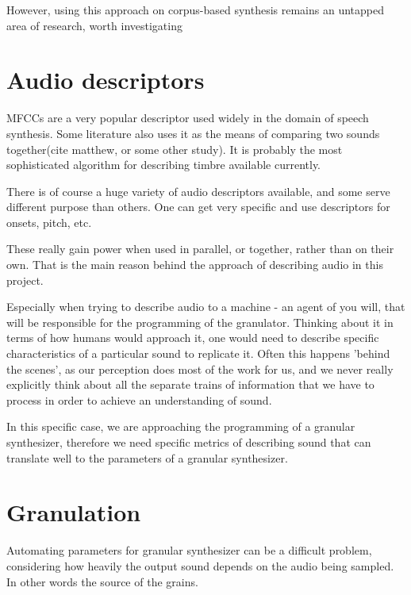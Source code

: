 However, using this approach on corpus-based synthesis remains an untapped area
of research, worth investigating

\section{Audio descriptors}

MFCCs are a very popular descriptor used widely in the domain of speech
synthesis. Some literature also uses it as the means of comparing two sounds
together(cite matthew, or some other study). It is probably the most
sophisticated algorithm for describing timbre available currently.

There is of course a huge variety of audio descriptors available, and some
serve different purpose than others. One can get very specific and use
descriptors for onsets, pitch, etc.

These really gain power when used in parallel, or together, rather than on their
own. That is the main reason behind the approach of describing audio in this
project.

Especially when trying to describe audio to a machine - an agent of you will,
that will be responsible for the programming of the granulator. Thinking about
it in terms of how humans would approach it, one would need to describe specific
characteristics of a particular sound to replicate it. Often this happens
'behind the scenes', as our perception does most of the work for us, and we
never really explicitly think about all the separate trains of information that
we have to process in order to achieve an understanding of sound.

In this specific case, we are approaching the programming of a granular
synthesizer, therefore we need specific metrics of describing sound that can
translate well to the parameters of a granular synthesizer.

\section{Granulation}

Automating parameters for granular synthesizer can be a difficult problem,
considering how heavily the output sound depends on the audio being sampled. In
other words the source of the grains.

